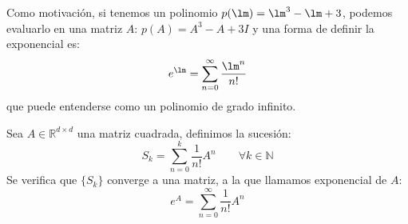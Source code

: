 \noindent
Como motivación, si tenemos un polinomio $p(\lm) = \lm^3 -\lm +  3$, podemos evaluarlo en una matriz $A$: 
$p(A) =A^3 -A+3I$ y una forma de definir la exponencial es:
\begin{equation*}
    e^\lm = \sum_{n=0}^{\infty} \dfrac{\lm^n}{n!}
\end{equation*}
que puede entenderse como un polinomio de grado infinito.
\begin{definicion}
    Sea $A\in \mathbb{R}^{d\times d}$ una matriz cuadrada, definimos la sucesión:
    \begin{equation*}
        S_k = \sum_{n=0}^{k} \dfrac{1}{n!} A^n \qquad \forall k\in \mathbb{N}
    \end{equation*}
    Se verifica que $\{S_k\}$ converge a una matriz, a la que llamamos exponencial de $A$:
    \begin{equation*}
        e^A = \sum_{n=0}^{\infty} \dfrac{1}{n!} A^n
    \end{equation*}
\end{definicion}

